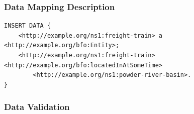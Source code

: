 \subsubsection*{Data Mapping Description}

\begin{verbatim}
INSERT DATA {
    <http://example.org/ns1:freight-train> a <http://example.org/bfo:Entity>;
    <http://example.org/ns1:freight-train> <http://example.org/bfo:locatedInAtSomeTime> 
        <http://example.org/ns1:powder-river-basin>.
}
\end{verbatim}

\subsubsection*{Data Validation}
